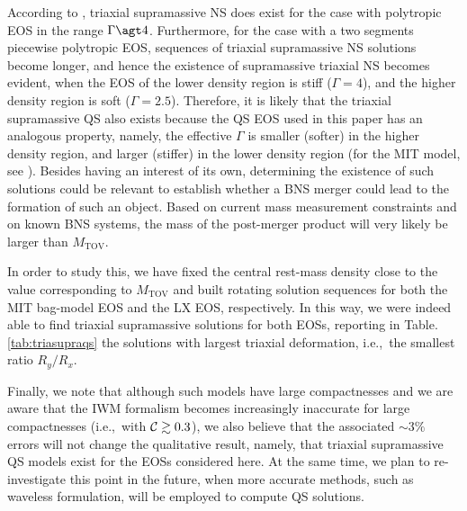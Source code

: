 \documentclass[twocolumn,superscriptaddress,showpacs,prd,aps,amsmath,amssymb,nofootinbib]{revtex4-1}
\newcommand{\ie}{i.e.,~}
\begin{document}
According to \cite{Uryu2016b}, triaxial supramassive NS does exist for
the case with polytropic EOS in the range $\Gamma \agt 4$.  Furthermore,
for the case with a two segments piecewise polytropic EOS, sequences of
triaxial supramassive NS solutions become longer, and hence the existence
of supramassive triaxial NS becomes evident, when the EOS of the lower
density region is stiff ($\Gamma=4$), and the higher density region is
soft ($\Gamma=2.5$)\cite{Uryu2016b}.  Therefore, it is likely that the
triaxial supramassive QS also exists because the QS EOS used in this
paper has an analogous property, namely, the effective $\Gamma$ is
smaller (softer) in the higher density region, and larger (stiffer) in
the lower density region (for the MIT model, see
\cite{gourgoulhon1999}). Besides having an interest of its own,
determining the existence of such solutions could be relevant to
establish whether a BNS merger could lead to the formation of such an
object. Based on current mass measurement constraints \cite{Demorest2010,
  Antoniadis2013} and on known BNS systems, the mass of the post-merger
product will very likely be larger than $M_\mathrm{TOV}$.

In order to study this, we have fixed the central rest-mass density close
to the value corresponding to $M_\mathrm{TOV}$ and built rotating
solution sequences for both the MIT bag-model EOS and the LX EOS,
respectively. In this way, we were indeed able to find triaxial
supramassive solutions for both EOSs, reporting in
Table.\ref{tab:triasupraqs} the solutions with largest triaxial
deformation, \ie the smallest ratio $R_y/R_x$. 

Finally, we note that although such models have large compactnesses and
we are aware that the IWM formalism becomes increasingly inaccurate for
large compactnesses (\ie with $\mathcal{C} \gtrsim 0.3$), we also believe that
the associated $\sim3\%$ errors will not change the qualitative result,
namely, that triaxial supramassive QS models exist for the EOSs
considered here. At the same time, we plan to re-investigate this point
in the future, when more accurate methods, such as waveless formulation,
will be employed to compute QS solutions.
\end{document}

